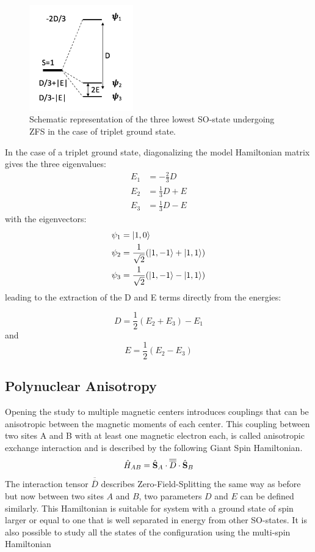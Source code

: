 \documentclass[10pt]{report}
\numberwithin{equation}{section}
\begin{document}
\begin{figure}
    \centering
    \includegraphics[width=0.4\textwidth]{Images/SpectreZFS.png}
    \caption{Schematic representation of the three lowest SO-state undergoing ZFS in the case of triplet ground state.}
    \label{SpectreZFS}
\end{figure}
In the case of a triplet ground state, diagonalizing the model Hamiltonian matrix gives the three eigenvalues:
\begin{align}
    E_1&=-\frac{2}{3}D\\
    E_2&=\frac{1}{3}D+E\\
    E_3&=\frac{1}{3}D-E
\end{align}
with the eigenvectors:
\begin{align}
    \psi_1&=\ket{1,0}\\
    \psi_2&=\frac{1}{\sqrt{2}}(\ket{1,-1}+\ket{1,1})\\
    \psi_3&=\frac{1}{\sqrt{2}}(\ket{1,-1}-\ket{1,1})
\end{align}
leading to the extraction of the D and E terms directly from the energies:

\begin{equation}
    D=\frac{1}{2}(E_2+E_3)-E_1
\end{equation}
and
\begin{equation}
    E=\frac{1}{2}(E_2-E_3)
\end{equation}



\subsection{Polynuclear Anisotropy}
Opening the study to multiple magnetic centers introduces couplings that can be anisotropic between the magnetic moments of each center. 
This coupling between two sites A and B with at least one magnetic electron each, is called anisotropic exchange interaction and is described by the following Giant Spin Hamiltonian.
\begin{equation}
    \hat{H}_{AB}=\hat{\vb S}_A\cdot \overline{\overline{D}} \cdot \hat{\vb S}_B
\end{equation}
The interaction tensor $\overline{\overline{D}}$ describes Zero-Field-Splitting the same way as before but now between two sites $A$ and $B$, two parameters $D$ and $E$ can be defined similarly. 
This Hamiltonian is suitable for system with a ground state of spin larger or equal to one that is well separated in energy from other SO-states.
It is also possible to study all the states of the configuration using the multi-spin Hamiltonian
\end{document}

